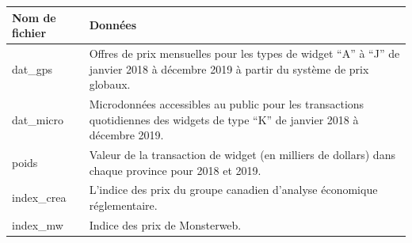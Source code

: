 \documentclass[]{article}
\begin{document}
\begin{longtable}[]{@{}ll@{}}
\toprule
\begin{minipage}[b]{0.47\columnwidth}\raggedright
Nom de fichier\strut
\end{minipage} & \begin{minipage}[b]{0.47\columnwidth}\raggedright
Données\strut
\end{minipage}\tabularnewline
\midrule
\endhead
\begin{minipage}[t]{0.47\columnwidth}\raggedright
dat\_gps\strut
\end{minipage} & \begin{minipage}[t]{0.47\columnwidth}\raggedright
Offres de prix mensuelles pour les types de widget ``A'' à ``J'' de janvier 2018 à décembre 2019 à partir du système de prix globaux.\strut
\end{minipage}\tabularnewline
\begin{minipage}[t]{0.47\columnwidth}\raggedright
dat\_micro\strut
\end{minipage} & \begin{minipage}[t]{0.47\columnwidth}\raggedright
Microdonnées accessibles au public pour les transactions quotidiennes des widgets de type ``K'' de janvier 2018 à décembre 2019.\strut
\end{minipage}\tabularnewline
\begin{minipage}[t]{0.47\columnwidth}\raggedright
poids\strut
\end{minipage} & \begin{minipage}[t]{0.47\columnwidth}\raggedright
Valeur de la transaction de widget (en milliers de dollars) dans chaque province pour 2018 et 2019.\strut
\end{minipage}\tabularnewline
\begin{minipage}[t]{0.47\columnwidth}\raggedright
index\_crea\strut
\end{minipage} & \begin{minipage}[t]{0.47\columnwidth}\raggedright
L'indice des prix du groupe canadien d'analyse économique réglementaire.\strut
\end{minipage}\tabularnewline
\begin{minipage}[t]{0.47\columnwidth}\raggedright
index\_mw\strut
\end{minipage} & \begin{minipage}[t]{0.47\columnwidth}\raggedright
Indice des prix de Monsterweb.\strut
\end{minipage}\tabularnewline
\bottomrule
\end{longtable}
\end{document}
